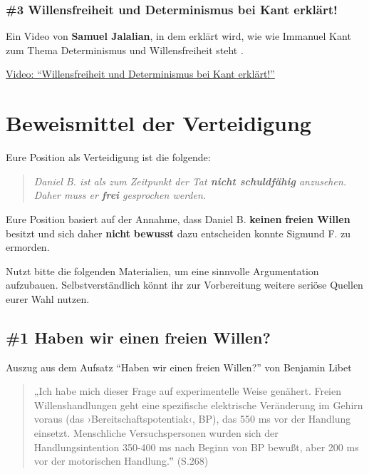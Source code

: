 \documentclass[
  a4paper,
]{report}
\begin{document}
\hypertarget{pr-expert-ev3}{%
\subsection{\#3 Willensfreiheit und Determinismus bei Kant erklärt!}\label{pr-expert-ev3}}

Ein Video von \textbf{Samuel Jalalian}, in dem erklärt wird, wie wie Immanuel Kant zum Thema Determinismus und Willensfreiheit steht \citep{Jalalian2022}.

\href{https://www.youtube.com/watch?v=Z8zJVcFVvX4}{Video: ``Willensfreiheit und Determinismus bei Kant erklärt!''}

\hypertarget{defence-evidence}{%
\chapter{Beweismittel der Verteidigung}\label{defence-evidence}}

Eure Position als Verteidigung ist die folgende:

\begin{quote}
\emph{Daniel B. ist als zum Zeitpunkt der Tat \textbf{nicht schuldfähig} anzusehen. Daher muss er \textbf{frei} gesprochen werden.}
\end{quote}

Eure Position basiert auf der Annahme, dass Daniel B. \textbf{keinen} \textbf{freien Willen} besitzt und sich daher \textbf{nicht} \textbf{bewusst} dazu entscheiden konnte Sigmund F. zu ermorden.

Nutzt bitte die folgenden Materialien, um eine sinnvolle Argumentation aufzubauen. Selbstverständlich könnt ihr zur Vorbereitung weitere seriöse Quellen eurer Wahl nutzen.

\hypertarget{def-ev1}{%
\section{\#1 Haben wir einen freien Willen?}\label{def-ev1}}

Auszug aus dem Aufsatz ``Haben wir einen freien Willen?'' von Benjamin Libet \citeyearpar{Libet2004}

\begin{quote}
„Ich habe mich dieser Frage auf experimentelle Weise genähert. Freien Willenshandlungen geht eine spezifische elektrische Veränderung im Gehirn voraus (das ›Bereitschaftspotentiak‹, BP), das 550 ms vor der Handlung einsetzt. Menschliche Versuchspersonen wurden sich der Handlungsintention 350-400 ms nach Beginn von BP bewußt, aber 200 ms vor der motorischen Handlung.‟ (S.268)
\end{quote}
\end{document}
